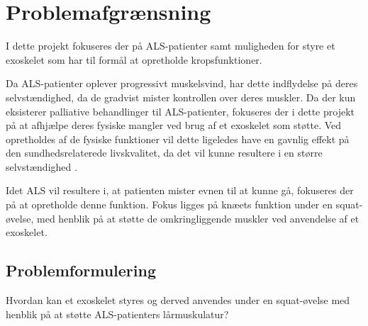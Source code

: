 \section{Problemafgrænsning}
I dette projekt fokuseres der på ALS-patienter samt muligheden for styre et exoskelet som har til formål at opretholde kropsfunktioner. 

Da ALS-patienter oplever progressivt muskelsvind, har dette indflydelse på deres selvstændighed, da de gradvist mister kontrollen over deres muskler. Da der kun eksisterer palliative behandlinger til ALS-patienter, fokuseres der i dette projekt på at afhjælpe deres fysiske mangler ved brug af et exoskelet som støtte.
Ved opretholdes af de fysiske funktioner vil dette ligeledes have en gavnlig effekt på den sundhedsrelaterede livskvalitet, da det vil kunne resultere i en større selvstændighed \citep{ilse2015, tramonti2012}.%

Idet ALS vil resultere i, at patienten mister evnen til at kunne gå, fokuseres der på at opretholde denne funktion. Fokus ligges på knæets funktion under en squat-øvelse, med henblik på at støtte de omkringliggende muskler ved anvendelse af et exoskelet.

\subsection{Problemformulering}
Hvordan kan et exoskelet styres og derved anvendes under en squat-øvelse med henblik på at støtte ALS-patienters lårmuskulatur?